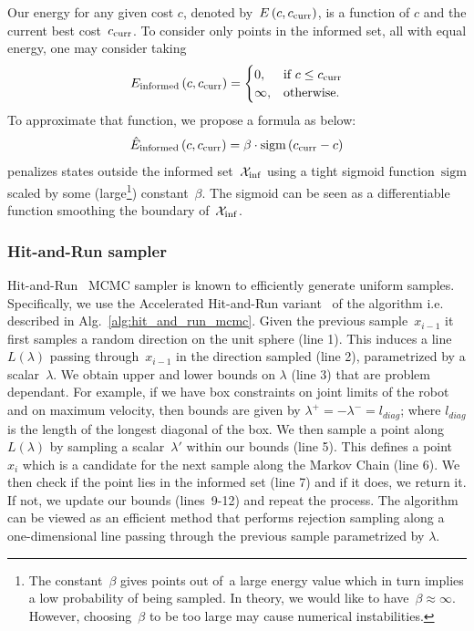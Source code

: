 \documentclass[letterpaper, 10 pt, conference]{ieeeconf}  %
\begin{document}
Our energy for any given cost $c$, 
denoted by~$E\left(c,c_{\rm{curr}} \right)$, 
is a function of $c$ and the current best cost~$c_{\rm{curr}}$.
To consider only points in the informed set, all with equal energy, one may consider taking 
\begin{equation}
E_{\text{informed}}\left(c,c_{\rm{curr}} \right) = 
\begin{cases}
0,	& \text{if } c \leq c_{\rm{curr}}\\        
\infty,  	& \text{otherwise}.
\end{cases}
\end{equation}
To approximate that function, we propose a formula as below:
\begin{equation}
\hat{E}_{\text{informed}} \left( c,c_{\rm{curr}} \right) 
= \beta \cdot \text{sigm}\left(c_{\rm{curr}} - c\right)
\end{equation}
penalizes states outside the informed set~$\mathcal{X}_{\rm {inf}}$ using a tight sigmoid function~$\text{sigm}$ scaled by some (large\footnote{The constant~$\beta$ gives points out of~\Cinf a large energy value which in turn implies a low probability of being sampled. 
In theory, we would like to have~$\beta \approx \infty$. 
However, choosing~$\beta$ to be too large may cause numerical instabilities.}) constant~$\beta$.
The sigmoid can be seen as a differentiable function smoothing the boundary of~$\mathcal{X}_{\rm {inf}}$.


\subsubsection{Hit-and-Run sampler}

Hit-and-Run~\cite{S84} MCMC sampler is known to efficiently generate uniform samples. Specifically, we use the Accelerated Hit-and-Run variant~\cite{KSZ11} of the algorithm i.e. described in Alg.~\ref{alg:hit_and_run_mcmc}.
Given the previous sample~$x_{i-1}$ it first  samples a random direction on the unit sphere (line 1).
This induces a line~$L(\lambda)$ passing through~$x_{i-1}$ in the direction sampled (line 2), parametrized by a scalar~$\lambda$.
We obtain upper and lower bounds on $\lambda$ (line 3) that are problem dependant. 
For example, if we have box constraints on joint limits of the robot and on maximum velocity, then bounds are given by $\lambda^{+} = -\lambda^{-} = l_{diag}$; where $l_{diag}$ is the length of the longest diagonal of the box.
We then sample a point along~$L(\lambda)$ by sampling a scalar~$\lambda'$ within our bounds (line 5).
This defines a point~$x_{i}$ which is a candidate for the next sample along the Markov Chain (line 6).
We then check if the point lies in the informed set (line 7) and if it does, we return it.
If not, we update our bounds (lines~9-12) and repeat the process.
The algorithm can be viewed as an efficient method that performs rejection sampling along a one-dimensional line passing through the previous sample parametrized by $\lambda$.
\end{document}
